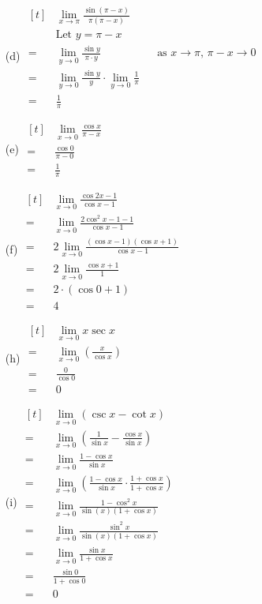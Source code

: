 \documentclass{article}
\begin{document}
\begin{multicols}{2}
\begin{itemize}
\item[(d)] 
$\begin{aligned}[t]
	&\lim\limits_{x\to\pi}\frac{\sin\left(\pi-x\right)}{\pi\left(\pi-x\right)} \\
	&\text{Let $y=\pi-x$} \\
	=&\lim\limits_{y\to0}\frac{\sin y}{\pi\cdot y} 
	&& \text{as $x\to\pi$, $\pi-x\to0$} \\
	=&\lim\limits_{y\to0}\frac{\sin y}{y}\cdot\lim\limits_{y\to0}\frac{1}{\pi} \\
	=&\boxed{\frac{1}{\pi}}
\end{aligned}$

\item[(e)] 
$\begin{aligned}[t]
	&\lim\limits_{x\to0}\frac{\cos x}{\pi-x} \\
	=&\frac{\cos0}{\pi-0} \\
	=&\boxed{\frac{1}{\pi}}
\end{aligned}$

\item[(f)] 
$\begin{aligned}[t]
	&\lim\limits_{x\to0}\frac{\cos2x-1}{\cos x-1} \\
	=&\lim\limits_{x\to0}\frac{2\cos^2x-1-1}{\cos x-1} \\
	=&2\lim\limits_{x\to0}\frac{\left(\cos x-1\right)\left(\cos x+1\right)}{\cos x-1} \\
	=&2\lim\limits_{x\to0}\frac{\cos x+1}{1} \\
	=&2\cdot\left(\cos0+1\right) \\
	=&\boxed{4}
\end{aligned}$

\item[(h)] 
$\begin{aligned}[t]
	&\lim\limits_{x\to0}x\sec x \\
	=&\lim\limits_{x\to0}\left(\frac{x}{\cos x}\right) \\
	=&\frac{0}{\cos0} \\
	=&\boxed{0}
\end{aligned}$

\item[(i)] 
$\begin{aligned}[t]
	&\lim\limits_{x\to0}\left(\csc x-\cot x\right) \\
	=&\lim\limits_{x\to0}\left(\frac{1}{\sin x}-\frac{\cos x}{\sin x}\right) \\
	=&\lim\limits_{x\to0}\frac{1-\cos x}{\sin x} \\
	=&\lim\limits_{x\to0}\left(\frac{1-\cos x}{\sin x}\cdot\frac{1+\cos x}{1+\cos x}\right) \\
	=&\lim\limits_{x\to0}\frac{1-\cos^2x}{\sin\left(x\right)\left(1+\cos x\right)} \\
	=&\lim\limits_{x\to0}\frac{\sin^2x}{\sin\left(x\right)\left(1+\cos x\right)} \\
	=&\lim\limits_{x\to0}\frac{\sin x}{1+\cos x} \\
	=&\frac{\sin0}{1+\cos0} \\
	=&\boxed{0}
\end{aligned}$


\end{itemize}
\end{multicols}
\end{document}
